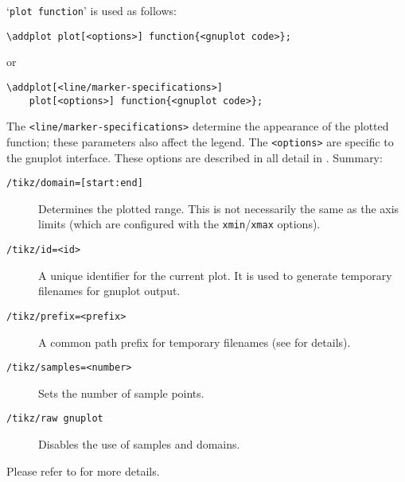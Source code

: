 `\texttt{plot function}' is used as follows:
\begin{lstlisting}
\addplot plot[<options>] function{<gnuplot code>};
\end{lstlisting}
or
\begin{lstlisting}
\addplot[<line/marker-specifications>] 
	plot[<options>] function{<gnuplot code>};
\end{lstlisting}
The \lstinline!<line/marker-specifications>! determine the appearance of the plotted function; these parameters also affect the legend. The \lstinline!<options>! are specific to the gnuplot interface. These options are described in all detail in \cite[section~18.6]{tikz}. Summary:
\begin{description}
\item[\texttt{/tikz/domain=[start:end]}] Determines the plotted range. This is not necessarily the same as the axis limits (which are configured with the \texttt{xmin}/\texttt{xmax} options). 
\item[\texttt{/tikz/id=<id>}] A unique identifier for the current plot. It is used to generate temporary filenames for gnuplot output.
\item[\texttt{/tikz/prefix=<prefix>}] A common path prefix for temporary filenames (see \cite[section~18.6]{tikz} for details).
\item[\texttt{/tikz/samples=<number>}] Sets the number of sample points.
\item[\texttt{/tikz/raw gnuplot}] Disables the use of samples and domains.
\end{description}
Please refer to \cite[section~18.6]{tikz} for more details.

